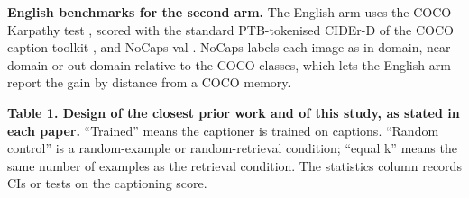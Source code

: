 \textbf{English benchmarks for the second arm.} The English arm uses the COCO Karpathy test
\citep{Lin2014COCO, Karpathy2015Split}, scored with the standard PTB-tokenised CIDEr-D of the COCO
caption toolkit \citep{Chen2015COCOCaptions}, and NoCaps val \citep{Agrawal2019NoCaps}. NoCaps
labels each image as in-domain, near-domain or out-domain relative to the COCO classes, which lets
the English arm report the gain by distance from a COCO memory.

\textbf{Table 1. Design of the closest prior work and of this study, as stated in each paper.}
``Trained'' means the captioner is trained on captions. ``Random control'' is a random-example or
random-retrieval condition; ``equal k'' means the same number of examples as the retrieval
condition. The statistics column records CIs or tests on the captioning score.

